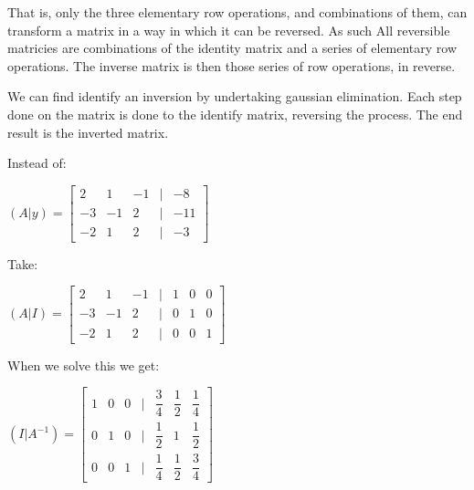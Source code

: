 That is, only the three elementary row operations, and combinations of them, can transform a matrix in a way in which it can be reversed. As such All reversible matricies are combinations of the identity matrix and a series of elementary row operations. The inverse matrix is then those series of row operations, in reverse.

We can find identify an inversion by undertaking gaussian elimination. Each step done on the matrix is done to the identify matrix, reversing the process. The end result is the inverted matrix.

Instead of:

\((A|y)=\begin{bmatrix}2 & 1&-1&|&-8\\-3 & -1&2&|&-11\\-2&1&2&|&-3\end{bmatrix}\)

Take:

\((A|I)=\begin{bmatrix}2 & 1&-1&|&1&0&0\\-3 & -1&2&|&0&1&0\\-2&1&2&|&0&0&1\end{bmatrix}\)

When we solve this we get:

\((I|A^{-1})=\begin{bmatrix}1 & 0&0&|&\dfrac{3}{4}&\dfrac{1}{2}&\dfrac{1}{4}\\0& 1&0&|&\dfrac{1}{2}&1&\dfrac{1}{2}\\0&0&1&|&\dfrac{1}{4}&\dfrac{1}{2}&\dfrac{3}{4}\end{bmatrix}\)

